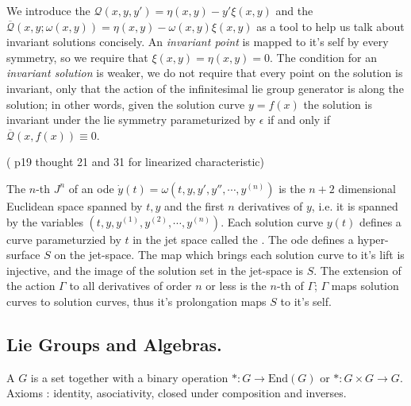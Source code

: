 \documentclass[12pt]{article}
\begin{document}
We introduce the  $\mathcal Q(x,y,y')=\eta(x,y)-y'\xi(x,y)$ and the  $\mathcal{\overline Q}(x,y;\omega(x,y)) = \eta(x,y)-\omega(x,y)\xi(x,y)$ as a tool to help us talk about invariant solutions concisely. An \textit{invariant point} is mapped to it's self by every symmetry, so we require that $\xi(x,y) = \eta(x,y) = 0$. The condition for an \textit{invariant solution} is weaker, we do not require that every point on the solution is invariant, only that the action of the infinitesimal lie group generator is along the solution; in other words, given the solution curve $y=f(x)$ the solution is invariant under the lie symmetry parameturized by $\epsilon$ if and only if $\mathcal{\overline Q}(x,f(x)) \equiv 0$. 


(\cite{Symmetry-methods} p19 thought 21 and 31 for linearized characteristic)

The $n$-th  $J^n$ of an ode $\dot y(t) = \omega(t,y,y',y'',\cdots,y^{(n)})$ is the $n+2$ dimensional Euclidean space spanned by $t,y$ and the first $n$ derivatives of $y$, i.e. it is spanned by the variables $(t,y,y^{(1)},y^{(2)},\cdots,y^{(n)})$. Each solution curve $y(t)$ defines a curve parameturzied by $t$ in the jet space called the . The ode defines a hyper-surface $S$ on the jet-space. The map which brings each solution curve to it's lift is injective, and the image of the solution set in the jet-space is $S$. The extension of the action $\Gamma$ to all derivatives of order $n$ or less is the $n$-th  of $\Gamma$; $\Gamma$ maps solution curves to solution curves, thus it's prolongation maps $S$ to it's self. 

\subsection{Lie Groups and Algebras.}

A  $G$ is a set together with a binary operation $\ast : G \to \text{End} (G)$ or $\ast : G\times G \to G$. Axioms : identity, asociativity, closed under composition and inverses. 
\end{document}
